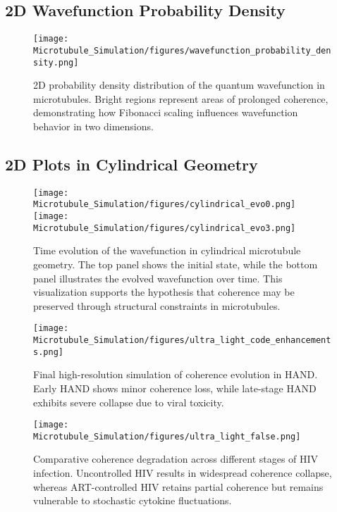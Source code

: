 \subsection{2D Wavefunction Probability Density}
\begin{figure}[H]
    \centering
    \texttt{[image: Microtubule\_Simulation/figures/wavefunction\_probability\_density.png]}
    \caption{2D probability density distribution of the quantum wavefunction in microtubules. Bright regions represent areas of prolonged coherence, demonstrating how Fibonacci scaling influences wavefunction behavior in two dimensions.}
    \label{fig:wavefunction_2D}
\end{figure}

\subsection{2D Plots in Cylindrical Geometry}
\begin{figure}[H]
    \centering
    \texttt{[image: Microtubule\_Simulation/figures/cylindrical\_evo0.png]}
    \texttt{[image: Microtubule\_Simulation/figures/cylindrical\_evo3.png]}
    \caption{Time evolution of the wavefunction in cylindrical microtubule geometry. The top panel shows the initial state, while the bottom panel illustrates the evolved wavefunction over time. This visualization supports the hypothesis that coherence may be preserved through structural constraints in microtubules.}
    \label{fig:cylindrical_geometry}
\end{figure}
\FloatBarrier  %

\begin{figure}[H]
    \centering
    \texttt{[image: Microtubule\_Simulation/figures/ultra\_light\_code\_enhancements.png]}
    \caption{Final high-resolution simulation of coherence evolution in HAND. Early HAND shows minor coherence loss, while late-stage HAND exhibits severe collapse due to viral toxicity.} \label{fig:HIV_coherence_evolution_final}
\end{figure}

\begin{figure}[H]
    \centering
    \texttt{[image: Microtubule\_Simulation/figures/ultra\_light\_false.png]}
    \caption{Comparative coherence degradation across different stages of HIV infection. Uncontrolled HIV results in widespread coherence collapse, whereas ART-controlled HIV retains partial coherence but remains vulnerable to stochastic cytokine fluctuations.}
    \label{fig:HIV_coherence_stages}
\end{figure}

